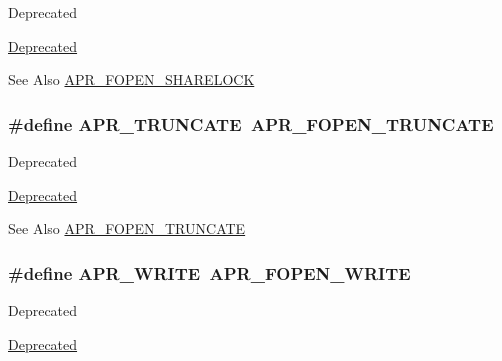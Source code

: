 \begin{DoxyRefDesc}{Deprecated}
\item[\hyperlink{deprecated__deprecated000027}{Deprecated}]\end{DoxyRefDesc}
\begin{DoxySeeAlso}{See Also}
\hyperlink{group__apr__file__open__flags_ga426f6e2a8457ab410d99248269059a18}{A\-P\-R\-\_\-\-F\-O\-P\-E\-N\-\_\-\-S\-H\-A\-R\-E\-L\-O\-C\-K} 
\end{DoxySeeAlso}
\hypertarget{group__apr__file__open__flags_gaa8898fdebd69d3a64286731b713a6dc9}{
\subsubsection[{A\-P\-R\-\_\-\-T\-R\-U\-N\-C\-A\-T\-E}]{\setlength{\rightskip}{0pt plus 5cm}\#define A\-P\-R\-\_\-\-T\-R\-U\-N\-C\-A\-T\-E~{\bf A\-P\-R\-\_\-\-F\-O\-P\-E\-N\-\_\-\-T\-R\-U\-N\-C\-A\-T\-E}}}\label{group__apr__file__open__flags_gaa8898fdebd69d3a64286731b713a6dc9}
\begin{DoxyRefDesc}{Deprecated}
\item[\hyperlink{deprecated__deprecated000021}{Deprecated}]\end{DoxyRefDesc}
\begin{DoxySeeAlso}{See Also}
\hyperlink{group__apr__file__open__flags_ga09b05a5bd5db534b93794f7657bcb146}{A\-P\-R\-\_\-\-F\-O\-P\-E\-N\-\_\-\-T\-R\-U\-N\-C\-A\-T\-E} 
\end{DoxySeeAlso}
\hypertarget{group__apr__file__open__flags_ga3e427e53aceb1ccdb078d9a03cd63d01}{
\subsubsection[{A\-P\-R\-\_\-\-W\-R\-I\-T\-E}]{\setlength{\rightskip}{0pt plus 5cm}\#define A\-P\-R\-\_\-\-W\-R\-I\-T\-E~{\bf A\-P\-R\-\_\-\-F\-O\-P\-E\-N\-\_\-\-W\-R\-I\-T\-E}}}\label{group__apr__file__open__flags_ga3e427e53aceb1ccdb078d9a03cd63d01}
\begin{DoxyRefDesc}{Deprecated}
\item[\hyperlink{deprecated__deprecated000018}{Deprecated}]\end{DoxyRefDesc}
